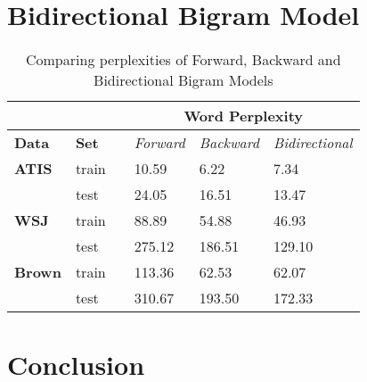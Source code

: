 \documentclass{article}
\begin{document}
\section{Bidirectional Bigram Model}
\begin{table}[h]
\centering
\begin{tabular}{@{}llllll@{}}
\toprule
\textbf{}      & \textbf{}    &  & \multicolumn{3}{c}{\textbf{Word Perplexity}}                  \\ \midrule
\textbf{Data}  & \textbf{Set} &  & \textit{Forward} & \textit{Backward} & \textit{Bidirectional} \\ \midrule
\textbf{ATIS}  & train        &  & 10.59           & 6.22             & 7.34                  \\ \midrule
               & test         &  & 24.05           & 16.51            & 13.47                 \\ \midrule
\textbf{WSJ}   & train        &  & 88.89           & 54.88            & 46.93                 \\ \midrule
               & test         &  & 275.12           & 186.51           & 129.10                \\ \midrule
\textbf{Brown} & train        &  & 113.36          & 62.53            & 62.07                  \\ \midrule
               & test         &  & 310.67          & 193.50           & 172.33               \\ \bottomrule
\end{tabular}
\caption{Comparing perplexities of Forward, Backward and Bidirectional Bigram Models}
\label{all}
\end{table}
\section{Conclusion}
\end{document}
